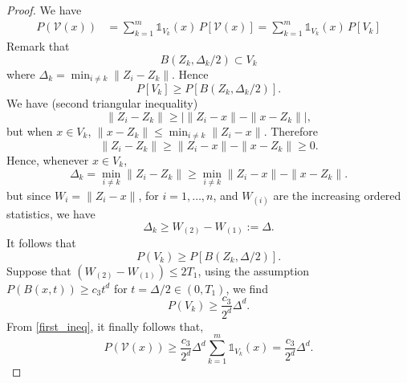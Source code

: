 \documentclass[paper=a4, fontsize=11pt]{scrartcl}
\newcommand{\ind}{\mathds{1}}
\begin{document}
\begin{proof}
We have
\begin{align}\label{first_ineq}
     P  (\mathcal{V}(x) ) %
    & = \sum _{k=1} ^ m \ind_{V_k }(x) \,  P [ \mathcal{V}(x) ]  = \sum _{k=1} ^ m \ind_{V_k }(x) \,  P [  V_k ]
\end{align}
Remark that 
$$   B ( Z_k , \Delta_k /2) \subset  V_k      $$
where $\Delta _k  = \min _{i\neq k} \|Z_i - Z_k\|$. 
Hence
$$  P [  V_k ] \geq  P [ B ( Z_k , \Delta_k /2) ].$$
We have (second triangular inequality)
$$ \|Z_i- Z_k\| \geq \left|  \|Z_i- x\| - \|x- Z_k\| \right|, $$
but when $x\in V_k$, $\|x-Z_k\| \leq  \min_{i\neq k} \|Z_i- x\| $. Therefore
$$ \|Z_i- Z_k\| \geq   \|Z_i- x\| - \|x- Z_k\| \geq 0. $$
Hence, whenever $x\in V_k$,
$$ \Delta _k = \min_{i\neq k} \|Z_i- Z_k\| \geq   \min_{i\neq k} \|Z_i- x\| - \|x- Z_k\|.$$
but since $ W_i =\| Z_i - x\| $, for $i=1,\ldots, n$, and $W_{(i)} $ are the increasing ordered statistics, we have
$$\Delta _k \geq W_{(2)} - W_{(1)} := \Delta.$$
It follows that
$$  P  (V_k) \geq   P [ B ( Z_k , \Delta /2) ].   $$
Suppose that $(W_{(2)} -  W_{(1)})\leq 2T_1$,  using the assumption $ P ( B(x,t) )  \geq c_3 t^d $ for $t = \Delta/2 \in (0, T_1)$, we find 
$$ P  (V_k) \geq \frac{c_3}{2^d}  \Delta^d .$$ 
From \eqref{first_ineq}, it finally follows that,
$$  P (\mathcal{V}(x) ) \geq  \frac{c_3}{2^d} \Delta ^d \sum _{k=1} ^ m \ind_{V_k } (x) = \frac{c_3}{2^d} \Delta ^d.$$
\end{proof}
%
%
%
\end{document}

